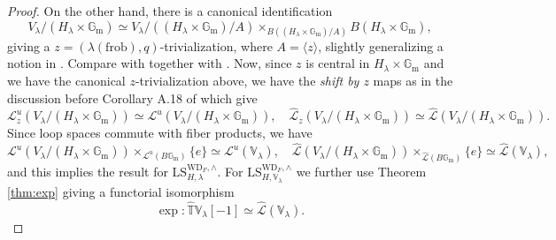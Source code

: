 \documentclass{amsart}
\theoremstyle{definition}
\theoremstyle{remark}
\numberwithin{equation}{section}
\newcommand{\mc}{\mathcal}
\newcommand{\bb}{\mathbb}
\newcommand{\Gm}{{\mathbb{G}_{\mathrm{m}}}}
\newcommand{\wh}{\widehat}
\newcommand{\frob}{\mathrm{frob}}
\newcommand{\V}{\mathbb{V}}
\newcommand{\WD}{\mathrm{WD}}
\newcommand{\LS}{\mathrm{LS}}
\begin{document}
\begin{proof}
On the other hand, there is a canonical identification
\[
V_{\lambda}/ (H_{\lambda}\times \Gm)\simeq V_{\lambda}/ ((H_{\lambda}\times \Gm)/A)\times_{B((H_{\lambda}\times \Gm)/A)}B(H_{\lambda}\times \Gm), 
\]
giving a $z=(\lambda (\frob), q)$-trivialization, where $A=\langle z\rangle$, slightly generalizing a notion in \cite[Definition A.16]{BCHNconstructible}. Compare with \cite[Proposition A.17]{BCHNconstructible} together with \cite[Proposition 2.1.22]{Chenequivariant}. Now, since $z$ is central in $H_{\lambda}\times \Gm$ and we have the canonical $z$-trivialization above, we have the \emph{shift by $z$} maps as in the discussion before Corollary A.18 of \cite{BCHNconstructible} which give
\begin{equation*}
   \mc{L}^u_z(V_{\lambda} /( H_{\lambda} \times \Gm)) \simeq  \mc{L}^u(V_{\lambda} / (H_{\lambda} \times \Gm)),  \quad \wh{\mc{L}}_z(V_{\lambda} / (H_{\lambda} \times \Gm)) \simeq \wh{\mc{L}}(V_{\lambda} / (H_{\lambda} \times \Gm)).
\end{equation*}
Since loop spaces commute with fiber products, we have 
\[
\mc{L}^u(V_{\lambda} / (H_{\lambda} \times \Gm))\times_{\mc L^u(B\Gm)}\{e\}\simeq \mc{L}^u(\V_{\lambda}), \quad
\wh{\mc{L}}(V_{\lambda} / (H_{\lambda} \times \Gm))\times_{\wh{\mc L}(B\Gm)}\{e\}\simeq \wh{\mc{L}}(\V_{\lambda}),
\]
and this implies the result for $\LS^{\WD_F, \wedge}_{H, \lambda}$. For $\LS^{\WD_F, \wedge}_{H, \V_{\lambda}}$ we further use Theorem \ref{thm:exp} giving a functorial isomorphism 
\[
\exp\colon \wh{\bb{T}}\V_{\lambda}[-1] \simeq \wh{\mc{L}}(\V_{\lambda}).
\]
\end{proof}
\end{document}
